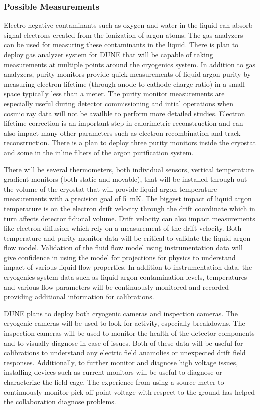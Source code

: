 \subsubsection{Possible Measurements}
Electro-negative contaminants such as oxygen and water in the liquid can absorb signal electrons created from the ionization of argon atoms. The gas analyzers can be used for measuring these contaminants in the liquid. There is plan to deploy gas analyzer system for DUNE that will be capable of taking measurements at multiple points around the cryogenics system. In addition to gas analyzers, purity monitors provide quick measurements of liquid argon purity by measuring electron lifetime (through anode to cathode charge ratio) in a small space typically less than a meter. The purity monitor measurements are especially useful during detector commissioning and intial operations when cosmic ray data will not be availble to perform more detailed studies. Electron lifetime correction is an important step in calorimetric reconstruction and can also impact many other parameters such as electron recombination and track reconstruction. There is a plan to deploy three purity monitors inside the cryostat and some in the inline filters of the argon purification system. 

There will be several thermometers, both individual sensors, vertical temperature gradient monitors (both static and movable), that will be installed through out the volume of the cryostat that will provide liquid argon temperature measurements with a precision goal of \SI{5}{\milli\kelvin}. The biggest impact of liquid argon temperature is on the electron drift velocity through the drift coordinate which in turn affects detector fiducial volume. Drift velocity can also impact measurements like electron diffusion which rely on a measurement of the drift velocity. Both temperature and purity monitor data will be critical to validate the liquid argon flow model. Validation of the fluid flow model using instrumentation data will give confidence in using the model for projections for physics to understand impact of various liquid flow properties. In addition to instrumentation data, the cryogenics system data such as liquid argon contamination levels, temperatures and various flow parameters will be continuously monitored and recorded providing additional information for calibrations.

DUNE plans to deploy both cryogenic cameras and inspection cameras. The cryogenic cameras will be used to look for  activity, especially breakdowns. The inspection cameras will be used to monitor the health of the detector components and to visually diagnose in case of issues. Both of these data will be useful for calibrations to understand any electric field anamolies or unexpected drift field responses. Additionally, to further monitor and diagnose high voltage issues, installing devices such as current monitors will be useful to diagnose or characterize the field cage. The experience from  using a source meter to continuously monitor pick off point voltage with respect to the ground has helped the collaboration diagnose  problems.

